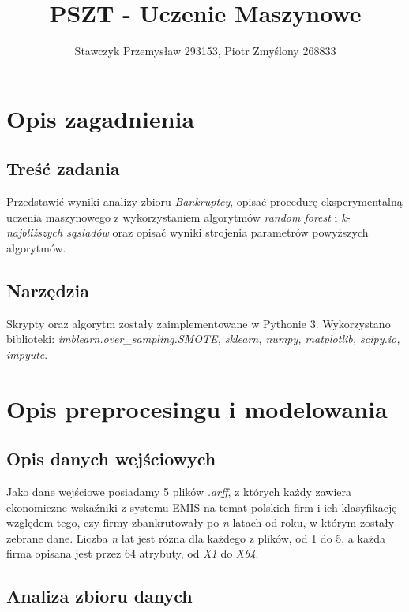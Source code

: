 \documentclass[11pt]{article}
\title{PSZT - Uczenie Maszynowe}
\author{Stawczyk Przemysław 293153, Piotr Zmyślony 268833}
\date{} %
\begin{document}
	\maketitle
	\setcounter{secnumdepth}{3}
	\setcounter{tocdepth}{3}
	\tableofcontents
	\clearpage
\section{Opis zagadnienia}
\subsection{Treść zadania}
Przedstawić wyniki analizy zbioru \textsl{Bankruptcy}, opisać procedurę eksperymentalną uczenia maszynowego z wykorzystaniem algorytmów \textsl{random forest} i \textsl{k-najbliższych sąsiadów} oraz opisać wyniki strojenia parametrów powyższych algorytmów.
\subsection{Narzędzia}
Skrypty oraz algorytm zostały zaimplementowane w Pythonie 3. Wykorzystano biblioteki: \textsl{imblearn.over\_sampling.SMOTE, sklearn, numpy, matplotlib, scipy.io, impyute}.
\section{Opis preprocesingu i modelowania}
\subsection{Opis danych wejściowych}
Jako dane wejściowe posiadamy 5 plików \textsl{.arff}, z których każdy zawiera ekonomiczne wskaźniki z systemu EMIS na temat polskich firm i ich klasyfikację względem tego, czy firmy zbankrutowały po \textsl{n} latach od roku, w którym zostały zebrane dane. Liczba \textsl{n} lat jest różna dla każdego z plików, od 1 do 5, a każda firma opisana jest przez 64 atrybuty, od \textsl{X1} do \textsl{X64}.
\subsection{Analiza zbioru danych}
\end{document}

